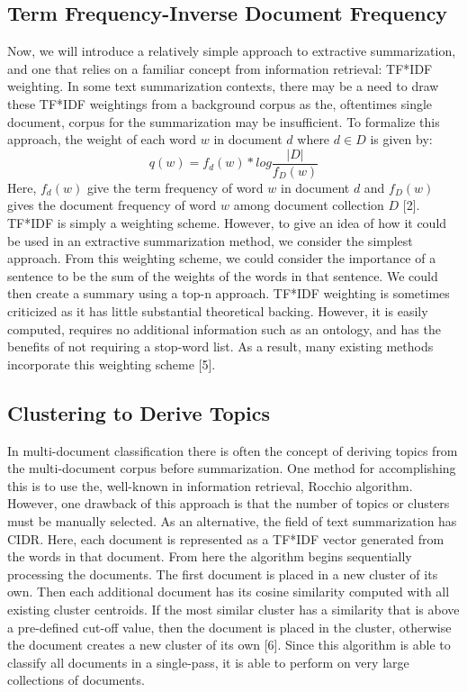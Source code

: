 \documentclass[11pt]{article}
\begin{document}
\subsection{Term Frequency-Inverse Document Frequency}
\label{sec:orgf3420f4}
Now, we will introduce a relatively simple approach to extractive summarization, and one that relies on a familiar concept from information retrieval: TF*IDF weighting. In some text summarization contexts, there may be a need to draw these TF*IDF weightings from a background corpus as the, oftentimes single document, corpus for the summarization may be insufficient. To formalize this approach, the weight of each word \(w\) in document \(d\) where \(d\in D\) is given by:
\begin{equation}
q(w)=f_d(w)*log\frac{|D|}{f_D(w)}
\end{equation}
Here, \(f_d(w)\) give the term frequency of word \(w\) in document \(d\) and \(f_D(w)\) gives the document frequency of word \(w\) among document collection \(D\) [2]. TF*IDF is simply a weighting scheme. However, to give an idea of how it could be used in an extractive summarization method, we consider the simplest approach. From this weighting scheme, we could consider the importance of a sentence to be the sum of the weights of the words in that sentence. We could then create a summary using a top-n approach. TF*IDF weighting is sometimes criticized as it has little substantial theoretical backing. However, it is easily computed, requires no additional information such as an ontology, and has the benefits of not requiring a stop-word list. As a result, many existing methods incorporate this weighting scheme [5].
\subsection{Clustering to Derive Topics}
\label{sec:org8bc5fab}
In multi-document classification there is often the concept of deriving topics from the multi-document corpus before summarization. One method for accomplishing this is to use the, well-known in information retrieval, Rocchio algorithm. However, one drawback of this approach is that the number of topics or clusters must be manually selected. As an alternative, the field of text summarization has CIDR. Here, each document is represented as a TF*IDF vector generated from the words in that document. From here the algorithm begins sequentially processing the documents. The first document is placed in a new cluster of its own. Then each additional document has its cosine similarity computed with all existing cluster centroids. If the most similar cluster has a similarity that is above a pre-defined cut-off value, then the document is placed in the cluster, otherwise the document creates a new cluster of its own [6]. Since this algorithm is able to classify all documents in a single-pass, it is able to perform on very large collections of documents. 
\end{document}
